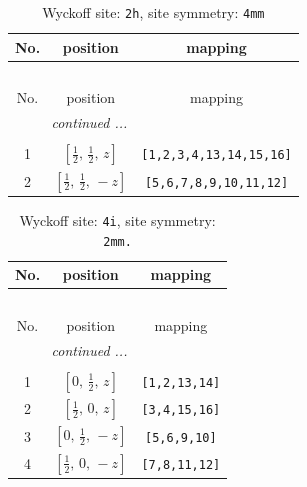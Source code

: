 \documentclass[fleqn,8pt]{jsarticle}
\begin{document}
\begin{longtable}{ccc}
\caption{Wyckoff site: {\tt 2h}, site symmetry: {\tt 4mm}}
 \\
 \hline \hline
No. & position & mapping \\ \hline \endfirsthead

\multicolumn{2}{l}{\tablename\ \thetable{}} \\
 \hline \hline
No. & position & mapping \\ \hline \endhead

 \hline \hline
\multicolumn{2}{r}{\footnotesize\it continued ...} \\ \endfoot

 \hline \hline
\multicolumn{2}{r}{} \\ \endlastfoot

1 & $\left[ \frac{1}{2},\, \frac{1}{2},\, z \right]$ & {\tt [1,2,3,4,13,14,15,16]} \\ \hline
2 & $\left[ \frac{1}{2},\, \frac{1}{2},\, - z \right]$ & {\tt [5,6,7,8,9,10,11,12]} \\
\end{longtable}
\renewcommand{\arraystretch}{1.2}
\begin{longtable}{ccc}
\caption{Wyckoff site: {\tt 4i}, site symmetry: {\tt 2mm.}}
 \\
 \hline \hline
No. & position & mapping \\ \hline \endfirsthead

\multicolumn{2}{l}{\tablename\ \thetable{}} \\
 \hline \hline
No. & position & mapping \\ \hline \endhead

 \hline \hline
\multicolumn{2}{r}{\footnotesize\it continued ...} \\ \endfoot

 \hline \hline
\multicolumn{2}{r}{} \\ \endlastfoot

1 & $\left[ 0,\, \frac{1}{2},\, z \right]$ & {\tt [1,2,13,14]} \\ \hline
2 & $\left[ \frac{1}{2},\, 0,\, z \right]$ & {\tt [3,4,15,16]} \\ \hline
3 & $\left[ 0,\, \frac{1}{2},\, - z \right]$ & {\tt [5,6,9,10]} \\ \hline
4 & $\left[ \frac{1}{2},\, 0,\, - z \right]$ & {\tt [7,8,11,12]} \\
\end{longtable}
\renewcommand{\arraystretch}{1.2}
\end{document}
